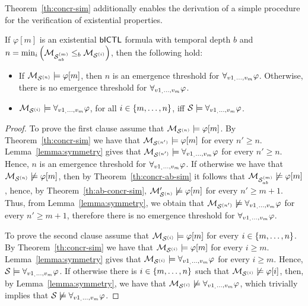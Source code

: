 Theorem~\ref{th:concr-sim} additionally enables the derivation of a simple
procedure for the verification of existential properties.

\begin{corollary}
\label{cor:existential}
If $\varphi[m]$ is an existential $\sf{bICTL}$ formula with temporal depth $b$ and  $n
= \min_i \left( \mathcal{M}_{\mathcal{S}_{ab}^{(m)}} \leq_b \mathcal{M}_{\mathcal{S}^{(i)}} \right)$, then the following hold:
\begin{itemize}
\item If $\mathcal{M}_{\mathcal{S}^{(n)}} \models \varphi[m]$, then $n$ is an emergence threshold for
$\forall_{v1_,\ldots,v_m} \varphi$. Otherwise, there is no emergence threshold for $\forall_{v1_,\ldots,v_m} \varphi$.

\item $\mathcal{M}_{\mathcal{S}^{(i)}} \models \forall_{v1_,\ldots,v_m} \varphi$, for all $i \in \left \{ m, \ldots, n \right \}$, iff
$\mathcal S \models \forall_{v1_,\ldots,v_m} \varphi$.
\end{itemize}
\end{corollary}
\begin{proof}
To prove the first clause assume that $\mathcal{M}_{\mathcal{S}^{(n)}} \models \varphi[m]$. By
Theorem~\ref{th:concr-sim} we have that $\mathcal{M}_{\mathcal{S}^{(n')}} \models \varphi[m]$ for every
$n' \geq n$. Lemma~\ref{lemma:symmetry} gives that  $\mathcal{M}_{\mathcal{S}^{(n')}} \models
\forall_{v1_,\ldots,v_m} \varphi$ for every $n' \geq n$. Hence, $n$ is an emergence threshold for
$\forall_{v1_,\ldots,v_m} \varphi$. If otherwise we have that  $\mathcal{M}_{\mathcal{S}^{(n)}} \not \models \varphi[m]$, then
by Theorem~\ref{th:concr-ab-sim} it follows  that $\mathcal{M}_{\mathcal{S}_{ab}^{(m)}} \not \models
\varphi[m]$, hence, by Theorem~\ref{th:ab-concr-sim}, $\mathcal{M}_{\mathcal{S}^{(n)}}' \not \models
\varphi[m]$ for every $n' \geq m+1$.  Thus, from Lemma~\ref{lemma:symmetry}, we
obtain that $\mathcal{M}_{\mathcal{S}^{(n')}} \not \models \forall_{v1_,\ldots,v_m} \varphi$ for every $n' \geq m + 1$,
therefore there is no emergence threshold for $\forall_{v1_,\ldots,v_m} \varphi$.

To prove the second clause assume that $\mathcal{M}_{\mathcal{S}^{(i)}} \models \varphi[m]$ for every $i
\in \left \{ m,\ldots,n \right \}$.  By Theorem~\ref{th:concr-sim} we have that $\mathcal{M}_{\mathcal{S}^{(i)}}
\models \varphi[m]$ for every $i \geq m$. Lemma~\ref{lemma:symmetry} gives that
$\mathcal{M}_{\mathcal{S}^{(i)}} \models \forall_{v1_,\ldots,v_m} \varphi$ for every $i \geq m$. Hence, $\mathcal S \models
\forall_{v1_,\ldots,v_m} \varphi$.  If otherwise there is $i \in \left \{ m, \ldots, n \right \}$ such that $\mathcal{M}_{\mathcal{S}^{(i)}} \not \models \varphi[i]$, then, by Lemma~\ref{lemma:symmetry}, we have that
$\mathcal{M}_{\mathcal{S}^{(i)}} \not \models \forall_{v1_,\ldots,v_m} \varphi$, which trivially implies that $\mathcal S \not
\models \forall_{v1_,\ldots,v_m} \varphi$.
\end{proof}

